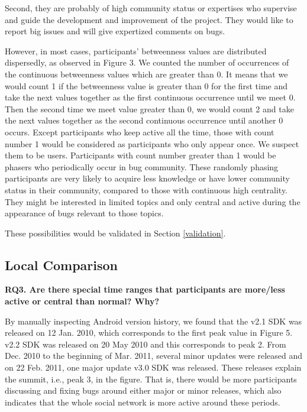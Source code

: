 \documentclass[10pt, conference, compsocconf]{IEEEtran}
\begin{document}
Second, they are probably of high community status or expertises who
supervise and guide the development and improvement of the
project. They would like to report big issues and will give expertized
comments on bugs. 


However, in most cases, participants' betweenness values are
distributed dispersedly, as observed in Figure 3. We counted the
number of occurrences of the continuous betweenness values which are
greater than 0. It means that we would count 1 if the betweenness
value is greater than 0 for the first time and take the next values
together as the first continuous occurrence until we meet 0. Then the
second time we meet value greater than 0, we would count 2 and take
the next values together as the second continuous occurrence until
another 0 occurs. Except participants who keep active all the time,
those with count number 1 would be considered as participants who only
appear once. We suspect them to be users. Participants with count
number greater than 1 would be phasers who periodically occur in bug
community. These randomly phasing participants are very likely to
acquire less knowledge or have lower community status in their
community, compared to those with continuous high centrality. They
might be interested in limited topics and only central and active
during the appearance of bugs relevant to those topics.


These possibilities would be validated in Section \ref{validation}.

\subsection{Local Comparison}
\label{local}

\textbf{RQ3. Are there special time ranges that participants are more/less active or central than normal? Why?}

By manually inspecting Android version history, we found that the v2.1
SDK was released on 12 Jan. 2010, which corresponds to the first peak
value in Figure 5. v2.2 SDK was released on 20 May 2010 and this
corresponds to peak 2. From Dec. 2010 to the beginning of Mar. 2011,
several minor updates were released and on 22 Feb. 2011, one major
update v3.0 SDK was released. These releases explain the summit, i.e.,
peak 3, in the figure. That is, there would be more participants
discussing and fixing bugs around either major or minor releases,
which also indicates that the whole social network is more active
around these periods.
\end{document}
